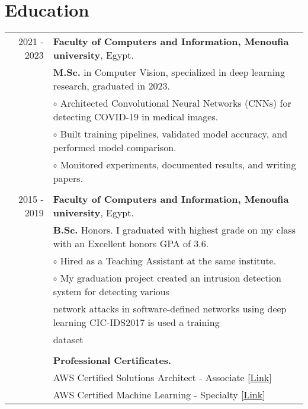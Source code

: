 \documentclass[a4paper,10pt]{article}
\begin{document}
\section{\textbf{Education}}
\begin{longtable}{r|l}
    2021 - 2023  & \textbf{Faculty of Computers and Information, Menoufia university}, Egypt.\\ & 
    \textbf{M.Sc.} in Computer Vision, specialized in deep learning research, graduated in 2023. \\ &
    $\circ$ Architected Convolutional Neural Networks (CNNs) for detecting COVID-19 in medical images. \\ &
    $\circ$ Built training pipelines, validated model accuracy, and performed model comparison. \\ &   
    $\circ$ Monitored experiments, documented results, and writing papers. \\
    &\\
    2015 - 2019 & \textbf{Faculty of Computers and Information, Menoufia university}, Egypt. \\ & 
    \textbf{B.Sc.} Honors. I graduated with highest grade on my class with an Excellent honors GPA of 3.6. \\ &
    $\circ$ Hired as a Teaching Assistant at the same institute. \\ &
    $\circ$ My graduation project created an intrusion detection system for detecting various \\ & network attacks in software-defined networks using deep learning CIC-IDS2017 is used a training \\ & dataset\\
    &\\
    & \textbf{Professional Certificates.} \\
    & AWS Certified Solutions Architect - Associate [\href{https://cp.certmetrics.com/amazon/en/public/verify/credential/8ff7ef944a1c49cf873b541903d9cbc3}{Link}] \\
    & AWS Certified Machine Learning - Specialty [\href{https://cp.certmetrics.com/amazon/en/public/verify/credential/b5b06f594c0a45929e1971bf5215daf7}{Link}] \\
\end{longtable}
\end{document}
